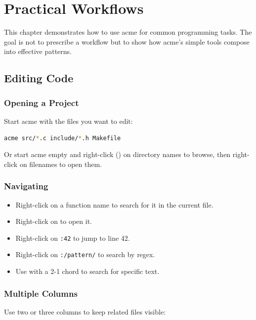 \chapter{Practical Workflows}
\label{ch:workflows}


This chapter demonstrates how to use acme for common programming tasks.
The goal is not to prescribe a workflow but to show how acme's simple
tools compose into effective patterns.

\section{Editing Code}
\label{sec:coding}

\subsection{Opening a Project}

Start acme with the files you want to edit:

\begin{lstlisting}[language=bash]
acme src/*.c include/*.h Makefile
\end{lstlisting}

Or start acme empty and right-click () on directory names to
browse, then right-click on filenames to open them.

\subsection{Navigating}

\begin{itemize}
\item Right-click on a function name to search for it in the current
      file.
\item Right-click on  to open it.
\item Right-click on \texttt{:42} to jump to line 42.
\item Right-click on \texttt{:/pattern/} to search by regex.
\item Use  with a 2-1 chord to search for specific text.
\end{itemize}

\subsection{Multiple Columns}

Use two or three columns to keep related files visible:

